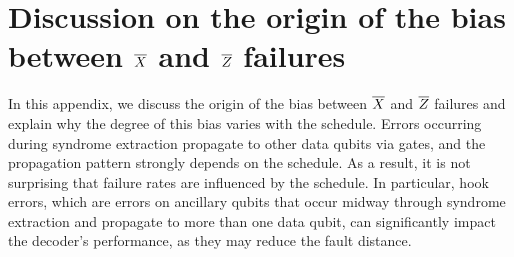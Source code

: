 \documentclass[a4paper,twocolumn,11pt,accepted=2025-01-21]{quantumarticle}
\theoremstyle{definition}
\theoremstyle{definition}
\theoremstyle{definition}
\begin{document}


\section{Discussion on the origin of the bias between $\overline{X}$ and $\overline{Z}$ failures \label{app:bias_origin}}

In this appendix, we discuss the origin of the bias between $\overline{X}$ and $\overline{Z}$ failures and explain why the degree of this bias varies with the \cnot schedule.
Errors occurring during syndrome extraction propagate to other data qubits via \cnot gates, and the propagation pattern strongly depends on the \cnot schedule.
As a result, it is not surprising that failure rates are influenced by the schedule.
In particular, hook errors, which are errors on ancillary qubits that occur midway through syndrome extraction and propagate to more than one data qubit, can significantly impact the decoder’s performance, as they may reduce the fault distance.
\end{document}
